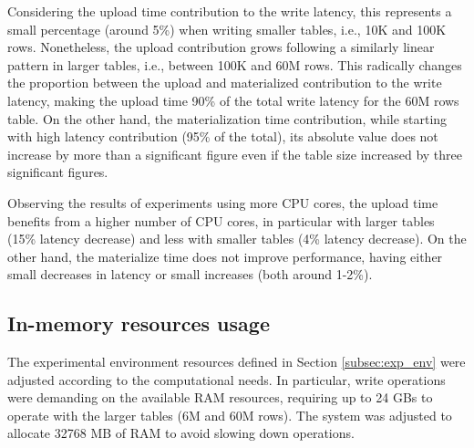 Considering the upload time contribution to the write latency, this represents a small percentage (around 5\%) when writing smaller tables, i.e., 10K and 100K rows. Nonetheless, the upload contribution grows following a similarly linear pattern in larger tables, i.e., between 100K and 60M rows. This radically changes the proportion between the upload and materialized contribution to the write latency, making the upload time 90\% of the total write latency for the 60M rows table. On the other hand, the materialization time contribution, while starting with high latency contribution (95\% of the total), its absolute value does not increase by more than a significant figure even if the table size increased by three significant figures.

Observing the results of experiments using more \gls{CPU} cores, the upload time benefits from a higher number of \gls{CPU} cores, in particular with larger tables (15\% latency decrease) and less with smaller tables (4\% latency decrease). On the other hand, the materialize time does not improve performance, having either small decreases in latency or small increases (both around 1-2\%).

\subsection{In-memory resources usage}
\label{subsec:resources_usage}

The experimental environment resources defined in Section \ref{subsec:exp_env} were adjusted according to the computational needs. In particular, write operations were demanding on the available \gls{RAM} resources, requiring up to 24 GBs to operate with the larger tables (6M and 60M rows). The system was adjusted to allocate 32768 MB of \gls{RAM} to avoid slowing down operations.